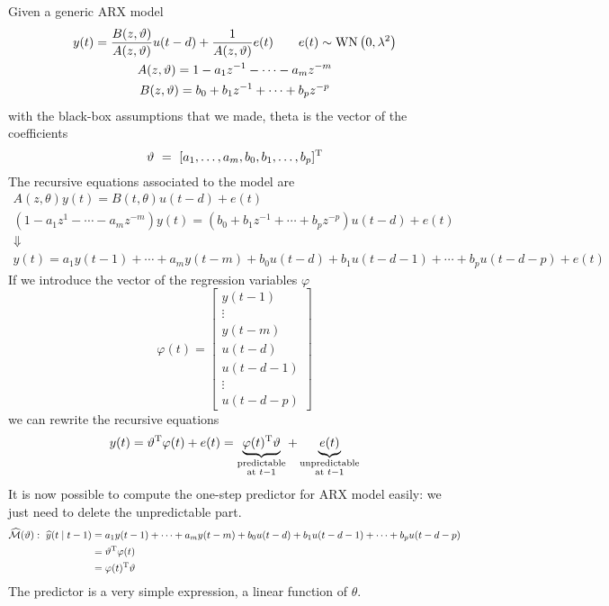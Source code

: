 Given a generic ARX model
\begin{gather*}
y(t) =\frac{B(z,\vartheta)}{A(z,\vartheta)} u(t-d) +\frac{1}{A(z,\vartheta)} e(t) \qquad e(t) \sim \operatorname{WN}\left(0,\lambda ^{2}\right)\\
A(z,\vartheta) =1-a_{1} z^{-1} -\cdots -a_{m} z^{-m}\\
B(z,\vartheta) =b_{0} +b_{1} z^{-1} +\cdots +b_{p} z^{-p}
\end{gather*}
with the black-box assumptions that we made, theta is the vector of the coefficients
\begin{equation*}
\vartheta \ =\ [ a_{1},\ldots,a_{m},b_{0},b_{1},\ldots,b_{p}]^{\mathrm{T}}
\end{equation*}
The recursive equations associated to the model are
\begin{gather*}
A(z,\theta) y(t) =B(t,\theta) u(t-d) +e(t)\\
\left(1-a_{1} z^{1} -\cdots -a_{m} z^{-m}\right) y(t) =\left(b_{0} +b_{1} z^{-1} +\cdots +b_{p} z^{-p}\right) u(t-d) +e(t)\\
\Downarrow \\
y(t) =a_{1} y(t-1) +\cdots +a_{m} y(t-m) +b_{0} u(t-d) +b_{1} u(t-d-1) +\cdots +b_{p} u(t-d-p) +e(t)
\end{gather*}
If we introduce the vector of the regression variables $ \varphi $
\begin{equation*}
\varphi (t) =\begin{bmatrix}
y(t-1)\\
\vdots\\
y(t-m)\\
u(t-d)\\
u(t-d-1)\\
\vdots\\
u(t-d-p)
\end{bmatrix}
\end{equation*}
we can rewrite the recursive equations
\begin{equation*}
	y(t) =\vartheta ^{\mathrm{T}} \varphi (t) +e(t) =\underbrace{\varphi (t)^{\mathrm{T}} \vartheta }_{\substack{\text{predictable}\\\text{at }t-1}} +\underbrace{e(t)}_{\substack{\text{unpredictable}\\\text{at }t-1}}
\end{equation*}
It is now possible to compute the one-step predictor for ARX model easily: we just need to delete the unpredictable part.
\begin{align*}
\widehat{\mathcal{M}}(\vartheta) :\ \widehat{y}(t\mid t-1) & =a_{1} y(t-1) +\cdots +a_{m} y(t-m) +b_{0} u(t-d) +b_{1} u(t-d-1) +\cdots +b_{p} u(t-d-p)\\
 & =\vartheta ^{\mathrm{T}} \varphi (t) \ \\
 & =\varphi (t)^{\mathrm{T}} \vartheta 
\end{align*}
The predictor is a very simple expression, a linear function of $ \theta $.

